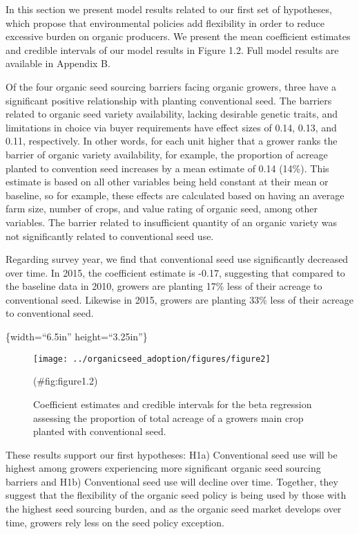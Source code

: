 \documentclass[twoside,12pt,final]{ucthesis-CA2012}
\begin{document}
\begin{ucmainmatter}
In this section we present model results related to our first set of
hypotheses, which propose that environmental policies add flexibility in
order to reduce excessive burden on organic producers. We present the
mean coefficient estimates and credible intervals of our model results
in Figure 1.2. Full model results are available in Appendix B.

Of the four organic seed sourcing barriers facing organic growers, three
have a significant positive relationship with planting conventional
seed. The barriers related to organic seed variety availability, lacking
desirable genetic traits, and limitations in choice via buyer
requirements have effect sizes of 0.14, 0.13, and 0.11, respectively. In
other words, for each unit higher that a grower ranks the barrier of
organic variety availability, for example, the proportion of acreage
planted to convention seed increases by a mean estimate of 0.14 (14\%).
This estimate is based on all other variables being held constant at
their mean or baseline, so for example, these effects are calculated
based on having an average farm size, number of crops, and value rating
of organic seed, among other variables. The barrier related to
insufficient quantity of an organic variety was not significantly
related to conventional seed use.

Regarding survey year, we find that conventional seed use significantly
decreased over time. In 2015, the coefficient estimate is -0.17,
suggesting that compared to the baseline data in 2010, growers are
planting 17\% less of their acreage to conventional seed. Likewise in
2015, growers are planting 33\% less of their acreage to conventional
seed.

\{width=``6.5in'' height=``3.25in''\}
\begin{figure}

{\centering \texttt{[image: ../organicseed\_adoption/figures/figure2]} 

}

\caption{Coefficient estimates and credible intervals for the beta regression assessing the proportion of total acreage of a growers main crop planted with conventional seed.}(\#fig:figure1.2)
\end{figure}
These results support our first hypotheses: H1a) Conventional seed use
will be highest among growers experiencing more significant organic seed
sourcing barriers and H1b) Conventional seed use will decline over time.
Together, they suggest that the flexibility of the organic seed policy
is being used by those with the highest seed sourcing burden, and as the
organic seed market develops over time, growers rely less on the seed
policy exception.


\end{ucmainmatter}
\end{document}
